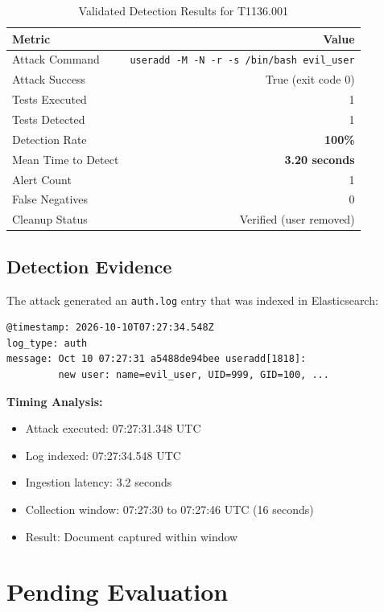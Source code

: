 \documentclass[11pt,a4paper]{article}
\begin{document}
\begin{table}[H]
    \centering
    \caption{Validated Detection Results for T1136.001}
    \begin{tabular}{lr}
        \toprule
        \textbf{Metric} & \textbf{Value} \\
        \midrule
        Attack Command & \texttt{useradd -M -N -r -s /bin/bash evil\_user} \\
        Attack Success & True (exit code 0) \\
        Tests Executed & 1 \\
        Tests Detected & 1 \\
        Detection Rate & \textbf{100\%} \\
        Mean Time to Detect & \textbf{3.20 seconds} \\
        Alert Count & 1 \\
        False Negatives & 0 \\
        Cleanup Status & Verified (user removed) \\
        \bottomrule
    \end{tabular}
\end{table}

\subsection{Detection Evidence}

The attack generated an \texttt{auth.log} entry that was indexed in Elasticsearch:

\begin{verbatim}
@timestamp: 2026-10-10T07:27:34.548Z
log_type: auth
message: Oct 10 07:27:31 a5488de94bee useradd[1818]:
         new user: name=evil_user, UID=999, GID=100, ...
\end{verbatim}

\textbf{Timing Analysis:}
\begin{itemize}
    \item Attack executed: 07:27:31.348 UTC
    \item Log indexed: 07:27:34.548 UTC
    \item Ingestion latency: 3.2 seconds
    \item Collection window: 07:27:30 to 07:27:46 UTC (16 seconds)
    \item Result: Document captured within window
\end{itemize}

\section{Pending Evaluation}
\end{document}

